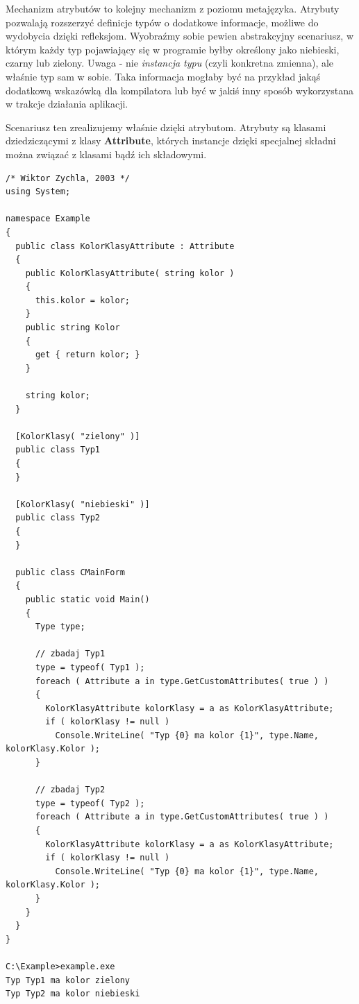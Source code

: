 Mechanizm atrybutów to kolejny mechanizm z poziomu metajęzyka. Atrybuty pozwalają rozszerzyć 
definicje typów o dodatkowe informacje, możliwe do wydobycia dzięki refleksjom. Wyobraźmy sobie pewien 
abstrakcyjny scenariusz, w którym każdy typ pojawiający się w programie byłby określony 
jako niebieski, czarny lub zielony. 
Uwaga - nie {\em instancja typu} (czyli konkretna zmienna), ale właśnie typ sam
w sobie. Taka informacja mogłaby być na przykład jakąś dodatkową wskazówką dla kompilatora lub być w jakiś
inny sposób wykorzystana w trakcje działania aplikacji. 

Scenariusz ten zrealizujemy właśnie dzięki atrybutom. Atrybuty są klasami dziedziczącymi z klasy
{\bf Attribute}, których instancje dzięki specjalnej składni można związać z klasami bądź ich składowymi.

\begin{scriptsize}
\begin{verbatim}
/* Wiktor Zychla, 2003 */
using System;

namespace Example
{
  public class KolorKlasyAttribute : Attribute
  {
    public KolorKlasyAttribute( string kolor )
    {
      this.kolor = kolor;
    }
    public string Kolor
    {
      get { return kolor; }
    }

    string kolor;
  }

  [KolorKlasy( "zielony" )]
  public class Typ1
  {
  }

  [KolorKlasy( "niebieski" )]
  public class Typ2
  {
  }

  public class CMainForm 
  {   
    public static void Main()
    {
      Type type;

      // zbadaj Typ1
      type = typeof( Typ1 );
      foreach ( Attribute a in type.GetCustomAttributes( true ) )
      {
        KolorKlasyAttribute kolorKlasy = a as KolorKlasyAttribute;
        if ( kolorKlasy != null )
          Console.WriteLine( "Typ {0} ma kolor {1}", type.Name, kolorKlasy.Kolor ); 
      }       

      // zbadaj Typ2
      type = typeof( Typ2 );
      foreach ( Attribute a in type.GetCustomAttributes( true ) )
      {
        KolorKlasyAttribute kolorKlasy = a as KolorKlasyAttribute;
        if ( kolorKlasy != null )
          Console.WriteLine( "Typ {0} ma kolor {1}", type.Name, kolorKlasy.Kolor ); 
      }       
    }
  }
}

C:\Example>example.exe
Typ Typ1 ma kolor zielony
Typ Typ2 ma kolor niebieski
\end{verbatim}
\end{scriptsize}

